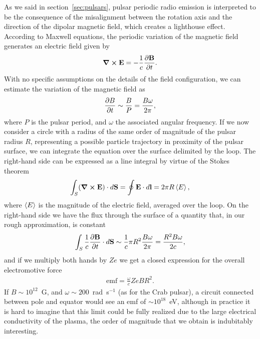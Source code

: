 As we said in section~\ref{sec:pulsars}, pulsar periodic radio emission is interpreted
to be the consequence of the misalignment between the rotation axis and the direction
of the dipolar magnetic field, which creates a lighthouse effect. According to Maxwell
equations, the periodic variation of the magnetic field generates an electric field
given by
\begin{align*}
  \curl{\vb{E}} = -\frac{1}{c}\pdv{\vb{B}}{t}.
\end{align*}
With no specific assumptions on the details of the field configuration, we can estimate
the variation of the magnetic field as
\begin{align*}
  \pdv{B}{t} \sim \frac{B}{P} = \frac{B\omega}{2\pi},
\end{align*}
where $P$ is the pulsar period, and $\omega$ the associated angular frequency.
If we now consider a circle with a radius of the same order of magnitude of the
pulsar radius $R$, representing a possible particle trajectory in proximity of the
pulsar surface, we can integrate the equation over the surface delimited by the
loop. The right-hand side can be expressed as a line integral by virtue of the
Stokes theorem
\begin{align*}
  \int_S (\curl{\vb{E}}) \cdot d\vb{S} = \oint \vb{E} \cdot d\vb{l} = 2\pi R \left<E\right>,
\end{align*}
where $\left<E\right>$ is the magnitude of the electric field, averaged over the loop. On
the right-hand side we have the flux through the surface of a quantity that, in our
rough approximation, is constant
\begin{align*}
  \int_S \frac{1}{c}\pdv{\vb{B}}{t} \cdot d\vb{S} \sim
  \frac{1}{c} \pi R^2 \frac{B\omega}{2\pi} = \frac{R^2 B \omega}{2c},
\end{align*}
and if we multiply both hands by $Ze$ we get a closed
expression for the overall electromotive force
\begin{align}\label{eq:pulsar_emf}
  \text{emf} = \frac{\omega}{c} Ze B R^2.
\end{align}
If $B \sim 10^{12}$~G, and $\omega \sim 200$~rad~s$^{-1}$ (as for the Crab pulsar),
a circuit connected between pole and equator would see an emf of $\sim 10^{18}$~eV,
although in practice it is hard to imagine that this limit could be fully realized
due to the large electrical conductivity of the plasma, the order of magnitude that
we obtain is indubitably interesting.


